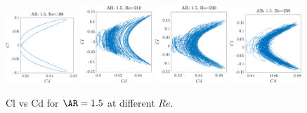 \begin{figure}
  \centering
  \includegraphics[width=0.24\textwidth]{./fig/nnl/ClCdAR1.5RE190.png}
  \includegraphics[width=0.24\textwidth]{./fig/nnl/ClCdAR1.5RE210.png}
  \includegraphics[width=0.24\textwidth]{./fig/nnl/ClCdAR1.5RE230.png}
  \includegraphics[width=0.24\textwidth]{./fig/nnl/ClCdAR1.5RE250.png}
  \caption{Cl vs Cd for $\AR=1.5$ at different $Re$.}
  \label{fig:ClCd}
\end{figure}


